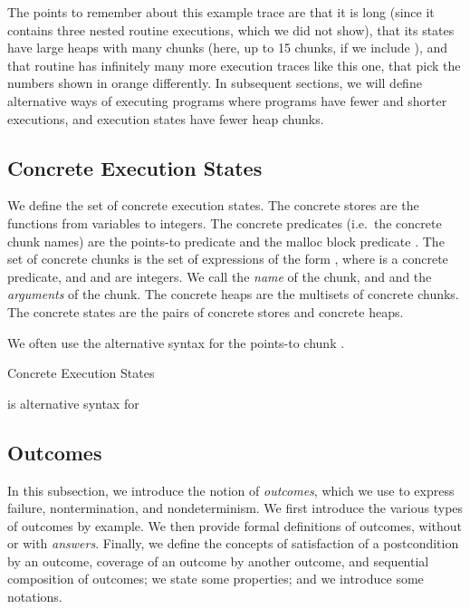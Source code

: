 \documentclass{CSML}
\theoremstyle{definition}\newtheorem{notation}[thm]{Notation}
\theoremstyle{plain}\newtheorem{satz}[thm]{Satz}
\begin{document}
The points to remember about this example trace are that it is 
long (since it contains three nested routine executions, which 
we did not show), that its states have large heaps with many 
chunks (here, up to 15 chunks, if we include ), and that 
routine  has infinitely many more execution 
traces like this one, that pick the numbers shown in orange 
differently. In subsequent sections, we will define alternative ways of executing programs
where programs have fewer and shorter executions, and execution states have fewer heap chunks.

\subsection{Concrete Execution States}

We define the set  of concrete execution 
states. The concrete stores  
are the functions from variables to integers. The concrete 
predicates (i.e.~the concrete chunk names) are the points-to 
predicate  and the malloc block predicate 
. The set of concrete chunks is the set of 
expressions of the form , where  is a concrete 
predicate, and  and  are integers. We call  the 
\emph{name} of the chunk, and  and  the 
\emph{arguments} of the chunk. The concrete heaps are the 
multisets of concrete chunks. The concrete states are the pairs 
of concrete stores and concrete heaps.

We often use the alternative syntax  for the 
points-to chunk . 

\begin{defi}{Concrete Execution States}



\begin{center}
 is alternative syntax for 
\end{center}

\end{defi}

\subsection{Outcomes}

In this subsection, we introduce the notion of \emph{outcomes}, which we use to express failure, nontermination, and nondeterminism. We first introduce the various types of outcomes by example. We then provide formal definitions of outcomes, without or with \emph{answers}. Finally, we define the concepts of satisfaction of a postcondition by an outcome, coverage of an outcome by another outcome, and sequential composition of outcomes; we state some properties; and we introduce some notations.
\end{document}
